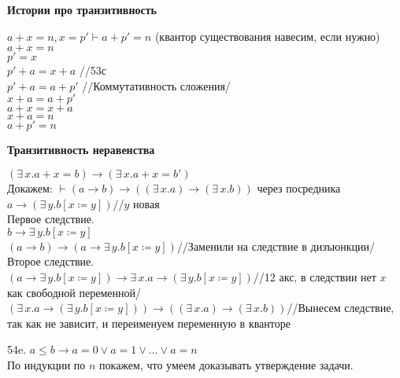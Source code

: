 \documentclass[12pt]{article}
\begin{document}
\newpage

\hypertarget{tratsit_stories}{{\bf Истории про транзитивность}}
$a+x=n,x=p'\vdash a+p'=n$ (квантор существования навесим, если нужно)\\
$a+x=n$\\
$p'=x$\\
$p'+a=x+a$ //53с\\
$p'+a=a+p'$ //Коммутативность сложения/\\
$x+a=a+p'$\\
$a+x=x+a$\\
$x+a=n$\\
$a+p'=n$

\bigskip

\hypertarget{tratsit_ineq}{{\bf Транзитивность неравенства}}
$(\exists\,x.a+x=b)\to (\exists\,x.a+x=b')$\\
Докажем: $\vdash (a\to b)\to ((\exists\,x.a)\to(\exists\,x.b))$ через посредника $a\to(\exists\,y.b[x\coloneqq y])$//$y$ новая\\
Первое следствие.\\
$b\to\exists\,y.b[x\coloneqq y]$\\
$(a\to b)\to (a\to\exists\,y.b[x\coloneqq y])$//Заменили на следствие в дизъюнкции/\\
Второе следствие.\\
$(a\to\exists\,y.b[x\coloneqq y])\to\exists\,x.a\to(\exists\,y.b[x\coloneqq y])$//12 акс, в следствии нет $x$ как свободной переменной/\\
$(\exists\,x.a\to(\exists\,y.b[x\coloneqq y]))\to((\exists\,x.a)\to(\exists\,x.b))$//Вынесем следствие, так как не зависит, и переименуем переменную в кванторе


\newpage

54e. $a\leqslant b\to a=0\vee a=1\vee\ldots\vee a=n$\\
По индукции по $n$ покажем, что умеем доказывать утверждение задачи.
\end{document}
